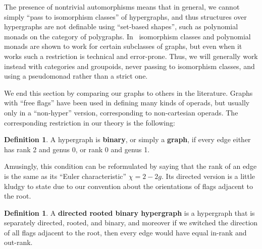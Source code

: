 \documentclass{article}
\theoremstyle{definition}
\newtheorem{defn}[thm]{Definition}
\theoremstyle{remark}
\def\genus{\mathsf{genus}}
\def\rank{\mathsf{rank}}
\begin{document}
The presence of nontrivial automorphisms means that in general, we cannot simply ``pass to isomorphism classes'' of hypergraphs, and thus structures over hypergraphs are not definable using ``set-based shapes'', such as polynomial monads on the category of polygraphs.
In~\cite{bb:htapm} isomorphism classes and polynomial monads are shown to work for certain subclasses of graphs, but even when it works such a restriction is technical and error-prone.
Thus, we will generally work instead with categories and groupoids, never passing to isomorphism classes, and using a pseudomonad rather than a strict one.

We end this section by comparing our graphs to others in the literature.
Graphs with ``free flags'' have been used in defining many kinds of operads, but usually only in a ``non-hyper'' version, corresponding to non-cartesian operads.
The corresponding restriction in our theory is the following:

\begin{defn}
  A hypergraph is \textbf{binary}, or simply a \textbf{graph}, if %
  every edge either has rank 2 and genus 0, or rank 0 and genus 1.
\end{defn}

Amusingly, this condition can be reformulated by saying that the rank of an edge is the same as its ``Euler characteristic'' $\chi=2-2g$.
Its directed version is a little kludgy to state due to our convention about the orientations of flags adjacent to the root.

\begin{defn}
  A \textbf{directed rooted binary hypergraph} is a hypergraph that is separately directed, rooted, and binary, and moreover if we switched the direction of all flags adjacent to the root, then every edge would have equal in-rank and out-rank.
\end{defn}
\end{document}
